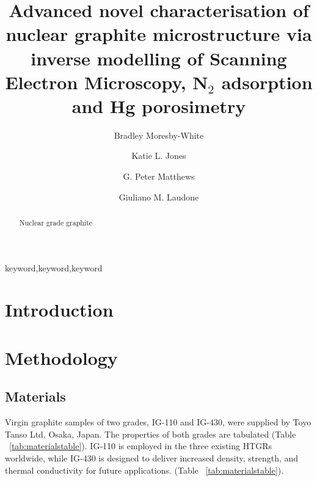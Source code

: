 \documentclass[review]{elsarticle}
\begin{document}
\begin{frontmatter}
\title{Advanced novel characterisation of nuclear graphite microstructure via inverse modelling of Scanning Electron Microscopy, N$_2$ adsorption and Hg porosimetry}
\author[plym]{Bradley Moresby-White}
\author[plym]{Katie L. Jones}
\author[plym]{G. Peter Matthews}
\author[plym]{Giuliano M. Laudone}
\address[plym]{Faculty of Science and Engineering, University of Plymouth, Plymouth, UK}
\begin{abstract}
Nuclear grade graphite
\end{abstract}
\begin{keyword}keyword\sep keyword\sep keyword\end{keyword}
\end{frontmatter}
\section{Introduction}
\section{Methodology}

\subsection{Materials}

Virgin graphite samples of two grades, IG-110 and IG-430, were supplied by Toyo
Tanso Ltd\texttrademark{}, Osaka, Japan. The properties of both grades are
tabulated (Table ~\ref{tab:materialstable}). IG‑110 is employed in the
three existing HTGRs worldwide, while IG‑430 is designed to deliver increased
density, strength, and thermal conductivity for future
applications.\citep{toyotanso_atomic_nuclear} (Table ~\ref{tab:materialstable}).

\begin{table}
  \centering
  \caption{Manufacturer dataset for IG-110 and IG-430 \citep{Jones2018, ARREGUIMENA2022112047}}
  \label{tab:materialstable}
\end{table}
\end{document}
